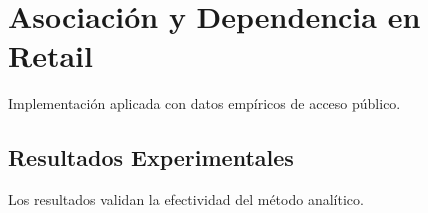 \section{Asociación y Dependencia en Retail}
Implementación aplicada con datos empíricos de acceso público.
\subsection{Resultados Experimentales}
Los resultados validan la efectividad del método analítico.

